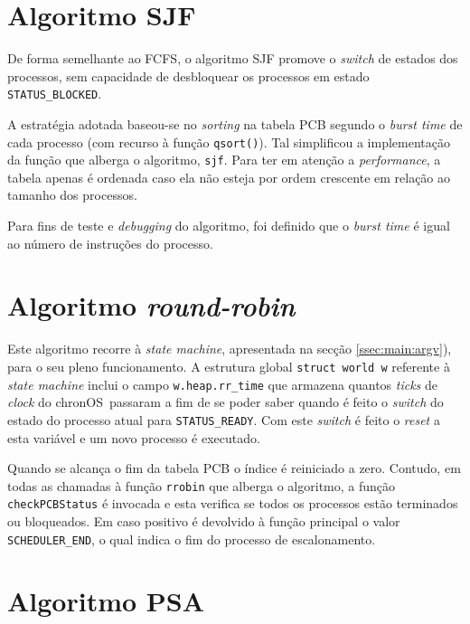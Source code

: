 \documentclass[10pt,oneside]{estiloUBI}
\newcommand{\chronOS}{\textsf{chronOS}}
\begin{document}
	
	\section{Algoritmo \ac{SJF}}
	\label{ssec::process:sjf}
	
	De forma semelhante ao \ac{FCFS}, o algoritmo \ac{SJF} promove o \textit{switch} de estados dos processos, sem capacidade de desbloquear os processos em estado \verb|STATUS_BLOCKED|.
	
	A estratégia adotada baseou-se no \textit{sorting} na tabela \ac{PCB} segundo o \textit{burst time} de cada processo (com recurso à função \verb|qsort()|). Tal simplificou a implementação da função que alberga o algoritmo, \verb|sjf|. Para ter em atenção a \textit{performance}, a tabela apenas é ordenada caso ela não esteja por ordem crescente em relação ao tamanho dos processos.
	
	Para fins de teste e \textit{debugging} do algoritmo, foi definido que o \textit{burst time} é igual ao número de instruções do processo.
	
	
	\section{Algoritmo \textit{round-robin}}
	\label{ssec:process:rrobin}
	
	Este algoritmo recorre à \textit{state machine}, apresentada na secção \ref{ssec:main:argv}), para o seu pleno funcionamento. A estrutura global \texttt{struct world w} referente à \textit{state machine} inclui o campo \verb|w.heap.rr_time| que armazena quantos \textit{ticks} de \textit{clock} do \chronOS~passaram a fim de se poder saber quando é feito o \textit{switch} do estado do processo atual para \verb|STATUS_READY|. Com este \textit{switch} é feito o \textit{reset} a esta variável e um novo processo é executado.
	
	Quando se alcança o fim da tabela \ac{PCB} o índice é reiniciado a zero. Contudo, em todas as chamadas à função \verb|rrobin| que alberga o algoritmo, a função \verb|checkPCBStatus| é invocada e esta verifica se todos os processos estão terminados ou bloqueados. Em caso positivo é devolvido à função principal o valor \verb|SCHEDULER_END|, o qual indica o fim do processo de escalonamento.
	
	
	\section{Algoritmo \ac{PSA}}
	\label{ssec:process:psa}
	
\end{document}
